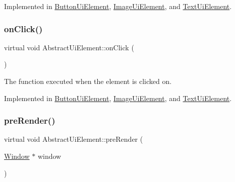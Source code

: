 Implemented in \mbox{\hyperlink{class_button_ui_element_ab321d646770df66f7ea58a7246d7bf28}{Button\+Ui\+Element}}, \mbox{\hyperlink{class_image_ui_element_a6d0f66cf68c5f035f5a9bfeaba3028f4}{Image\+Ui\+Element}}, and \mbox{\hyperlink{class_text_ui_element_aaf04a9d0a67e77e2ba2a306e1ec7aeed}{Text\+Ui\+Element}}.

\mbox{\label{class_abstract_ui_element_a42296c15c9e70b6ac7fda0b1862612af}} 
\subsubsection{\texorpdfstring{on\+Click()}{onClick()}}
{\footnotesize\ttfamily virtual void Abstract\+Ui\+Element\+::on\+Click (\begin{DoxyParamCaption}{ }\end{DoxyParamCaption})\hspace{0.3cm}{\ttfamily [pure virtual]}}



The function executed when the element is clicked on. 



Implemented in \mbox{\hyperlink{class_button_ui_element_a06c748ef9e81216f76d7db936d320365}{Button\+Ui\+Element}}, \mbox{\hyperlink{class_image_ui_element_ab3c388de0807d86016a2ff43fd6d337e}{Image\+Ui\+Element}}, and \mbox{\hyperlink{class_text_ui_element_a984d8bcd627f43c1bd858a707df2c042}{Text\+Ui\+Element}}.

\mbox{\label{class_abstract_ui_element_a859f627ab385e9d3bf6ce8db40607cdb}} 
\subsubsection{\texorpdfstring{pre\+Render()}{preRender()}}
{\footnotesize\ttfamily virtual void Abstract\+Ui\+Element\+::pre\+Render (\begin{DoxyParamCaption}\item[{\mbox{\hyperlink{class_window}{Window}} $\ast$}]{window }\end{DoxyParamCaption})\hspace{0.3cm}{\ttfamily [pure virtual]}}

